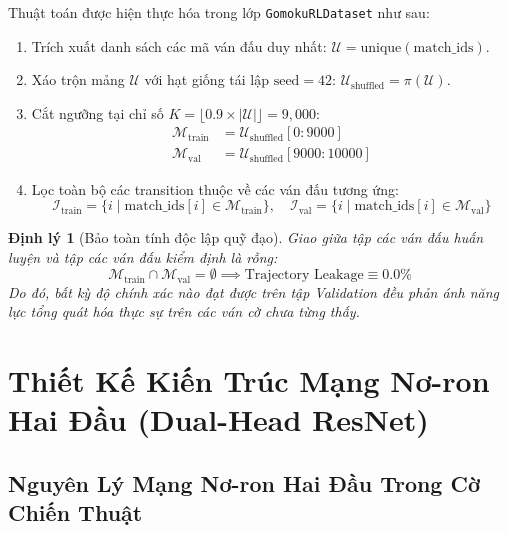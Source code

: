\documentclass[11pt,a4paper]{report}
\newtheorem{theorem}{Định lý}[chapter]
\begin{document}
Thuật toán được hiện thực hóa trong lớp \texttt{GomokuRLDataset} như sau:
\begin{enumerate}
    \item Trích xuất danh sách các mã ván đấu duy nhất: $\mathcal{U} = \text{unique}(\text{match\_ids})$.
    \item Xáo trộn mảng $\mathcal{U}$ với hạt giống tái lập $\text{seed} = 42$: $\mathcal{U}_{\text{shuffled}} = \pi(\mathcal{U})$.
    \item Cắt ngưỡng tại chỉ số $K = \lfloor 0.9 \times |\mathcal{U}| \rfloor = 9{,}000$:
    \begin{align}
        \mathcal{M}_{\text{train}} &= \mathcal{U}_{\text{shuffled}}[0 : 9000] \\
        \mathcal{M}_{\text{val}} &= \mathcal{U}_{\text{shuffled}}[9000 : 10000]
    \end{align}
    \item Lọc toàn bộ các transition thuộc về các ván đấu tương ứng:
    \begin{equation}
        \mathcal{I}_{\text{train}} = \{ i \mid \text{match\_ids}[i] \in \mathcal{M}_{\text{train}} \}, \quad \mathcal{I}_{\text{val}} = \{ i \mid \text{match\_ids}[i] \in \mathcal{M}_{\text{val}} \}
    \end{equation}
\end{enumerate}

\begin{theorem}[Bảo toàn tính độc lập quỹ đạo]
Giao giữa tập các ván đấu huấn luyện và tập các ván đấu kiểm định là rỗng:
\begin{equation}
    \mathcal{M}_{\text{train}} \cap \mathcal{M}_{\text{val}} = \emptyset \implies \text{Trajectory Leakage} \equiv 0.0\%
\end{equation}
Do đó, bất kỳ độ chính xác nào đạt được trên tập Validation đều phản ánh năng lực tổng quát hóa thực sự trên các ván cờ chưa từng thấy.
\end{theorem}

\chapter{Thiết Kế Kiến Trúc Mạng Nơ-ron Hai Đầu (Dual-Head ResNet)}

\section{Nguyên Lý Mạng Nơ-ron Hai Đầu Trong Cờ Chiến Thuật}
\end{document}

